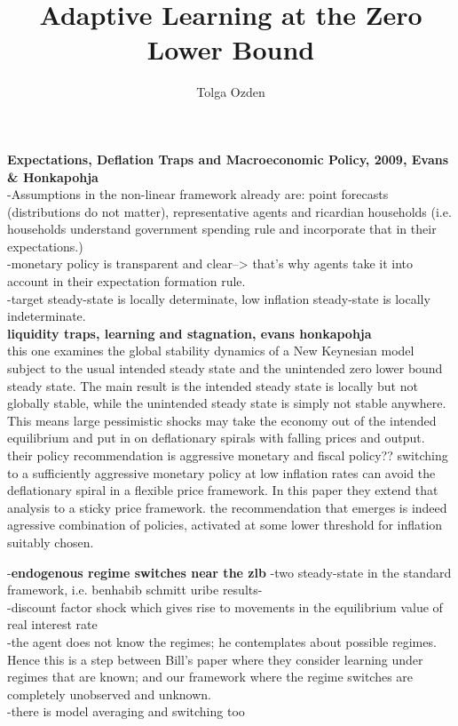 \documentclass[12pt,reqno]{article}
\title{Adaptive Learning at the Zero Lower Bound}
\author{Tolga Ozden}
\numberwithin{equation}{section}
\begin{document}
\noindent
\textbf{Expectations, Deflation Traps and Macroeconomic Policy, 2009, Evans \& Honkapohja} \\

-Assumptions in the non-linear framework already are: point forecasts (distributions do not matter), representative agents and ricardian households (i.e. households understand 
government spending rule and incorporate that in their expectations.)\\
-monetary policy is transparent and clear--> that's why agents take it into account in their expectation formation rule. \\
-target steady-state is locally determinate, low inflation steady-state is locally indeterminate.\\

\textbf{liquidity traps, learning and stagnation, evans honkapohja} \\

this one examines the global stability dynamics of a New Keynesian model subject to the usual intended steady state and the unintended zero lower bound steady state. The main result is the intended steady state is locally but not globally stable, while the unintended steady state is simply not stable anywhere. This means large pessimistic shocks may take the economy out of the intended equilibrium and put in on deflationary spirals with falling prices and output. their policy recommendation is aggressive monetary and fiscal policy?? switching to a sufficiently aggressive monetary policy at low inflation rates can avoid the deflationary spiral in a flexible price framework. In this paper they extend that analysis to a sticky price framework. the recommendation that emerges is indeed agressive combination of policies, activated at some lower threshold for inflation suitably chosen. 

-\textbf{endogenous regime switches near the zlb}
-two steady-state in the standard framework, i.e. benhabib schmitt uribe results-\\
-discount factor shock which gives rise to movements in the equilibrium value of real interest rate\\
-the agent does not know the regimes; he contemplates about possible regimes. Hence this is a step between Bill's paper where they consider learning under regimes that are known; and our framework where the regime switches are completely unobserved and unknown. \\
-there is model averaging and switching too\\
\end{document}
